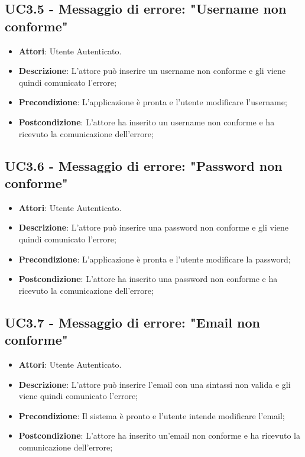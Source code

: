 \subsection{UC3.5 - Messaggio di errore: "Username non conforme"} 
\label{ssec:UC3.5} 
\begin{itemize} 
\item \textbf{Attori}: Utente Autenticato.
\item \textbf{Descrizione}: L'attore può inserire un username non conforme e gli viene quindi comunicato l'errore;
\item \textbf{Precondizione}: L'applicazione è pronta e l'utente modificare l'username;
\item \textbf{Postcondizione}: L'attore ha inserito un username non conforme e ha ricevuto la comunicazione dell'errore;
\end{itemize} 
\subsection{UC3.6 - Messaggio di errore: "Password non conforme"} 
\label{ssec:UC3.6} 
\begin{itemize} 
\item \textbf{Attori}: Utente Autenticato.
\item \textbf{Descrizione}: L'attore può inserire una password non conforme e gli viene quindi comunicato l'errore;
\item \textbf{Precondizione}: L'applicazione è pronta e l'utente modificare la password;
\item \textbf{Postcondizione}: L'attore ha inserito una password non conforme e ha ricevuto la comunicazione dell'errore;
\end{itemize} 
\subsection{UC3.7 - Messaggio di errore: "Email non conforme"} 
\label{ssec:UC3.7} 
\begin{itemize} 
\item \textbf{Attori}: Utente Autenticato.
\item \textbf{Descrizione}: L'attore può inserire l'email con una sintassi non valida e gli viene quindi comunicato l'errore;
\item \textbf{Precondizione}: Il sistema è pronto e l'utente intende modificare l'email;
\item \textbf{Postcondizione}: L'attore ha inserito un'email non conforme e ha ricevuto la comunicazione dell'errore;
\end{itemize} 
